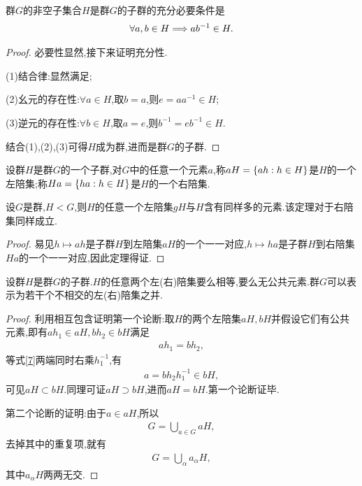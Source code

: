 \begin{theorem}\label{1.4.1}
    群$G$的非空子集合$H$是群$G$的子群的充分必要条件是\begin{align*}
        \forall a,b\in H\Longrightarrow ab^{-1}\in H.
    \end{align*}
\end{theorem}

\begin{proof}
    必要性显然,接下来证明充分性.

    (1)结合律:显然满足;

    (2)幺元的存在性:$\forall a\in H$,取$b=a$,则$e=aa^{-1}\in H$;

    (3)逆元的存在性:$\forall b\in H$,取$a=e$,则$b^{-1}=eb^{-1}\in H$.

    结合(1),(2),(3)可得$H$成为群,进而是群$G$的子群.
\end{proof}
\begin{definition}
    设群$H$是群$G$的一个子群,对$G$中的任意一个元素$a$,称$aH=\left\{ah:h\in H\right\}$是$H$的一个左陪集;称$Ha=\left\{ha:h\in H\right\}$是$H$的一个右陪集.
\end{definition}
\begin{theorem}\label{vu1}
    设$G$是群,$H<G$,则$H$的任意一个左陪集$gH$与$H$含有同样多的元素.该定理对于右陪集同样成立.
\end{theorem}
\begin{proof}
    易见$h\mapsto ah$是子群$H$到左陪集$aH$的一个一一对应,$h\mapsto ha$是子群$H$到右陪集$Ha$的一个一一对应,因此定理得证.
\end{proof}
\begin{theorem}\label{1.4.2}
    设群$H$是群$G$的子群.$H$的任意两个左(右)陪集要么相等,要么无公共元素.群$G$可以表示为若干个不相交的左(右)陪集之并.
\end{theorem}
\begin{proof}
    利用相互包含证明第一个论断:取$H$的两个左陪集$aH,bH$并假设它们有公共元素,即有$ah_1\in aH,bh_2\in bH$满足\begin{align}
        ah_1=bh_2,\label{7}
    \end{align}等式\eqref{7}两端同时右乘$h_1^{-1}$,有\begin{align*}
        a=bh_2h_1^{-1}\in bH,
    \end{align*}可见$aH\subset bH$.同理可证$aH\supset bH$,进而$aH=bH$.第一个论断证毕.

    第二个论断的证明:由于$a\in aH$,所以\begin{align*}
        G=\bigcup_{a\in G}aH,
    \end{align*}去掉其中的重复项,就有\begin{align*}
        G=\bigcup_{\alpha}a_{\alpha}H,
    \end{align*}其中$a_{\alpha}H$两两无交.
\end{proof}
